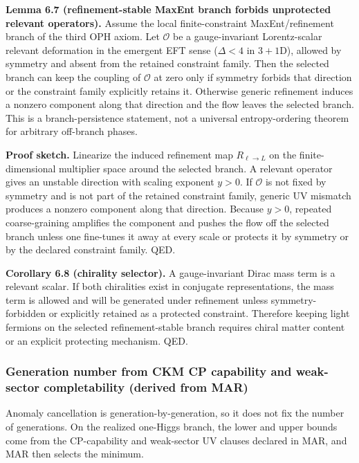 \textbf{Lemma 6.7 (refinement-stable MaxEnt branch forbids unprotected relevant operators).} Assume the local finite-constraint MaxEnt/refinement branch of the third OPH axiom. Let \(\mathcal{O}\) be a gauge-invariant Lorentz-scalar relevant deformation in the emergent EFT sense (\(\Delta<4\) in \(3+1\)D), allowed by symmetry and absent from the retained constraint family. Then the selected branch can keep the coupling of \(\mathcal{O}\) at zero only if symmetry forbids that direction or the constraint family explicitly retains it. Otherwise generic refinement induces a nonzero component along that direction and the flow leaves the selected branch. This is a branch-persistence statement, not a universal entropy-ordering theorem for arbitrary off-branch phases.

\textbf{Proof sketch.} Linearize the induced refinement map \(R_{\ell\to L}\) on the finite-dimensional multiplier space around the selected branch. A relevant operator gives an unstable direction with scaling exponent \(y>0\). If \(\mathcal{O}\) is not fixed by symmetry and is not part of the retained constraint family, generic UV mismatch produces a nonzero component along that direction. Because \(y>0\), repeated coarse-graining amplifies the component and pushes the flow off the selected branch unless one fine-tunes it away at every scale or protects it by symmetry or by the declared constraint family. QED.

\textbf{Corollary 6.8 (chirality selector).} A gauge-invariant Dirac mass term is a relevant scalar. If both chiralities exist in conjugate representations, the mass term is allowed and will be generated under refinement unless symmetry-forbidden or explicitly retained as a protected constraint. Therefore keeping light fermions on the selected refinement-stable branch requires chiral matter content or an explicit protecting mechanism. QED.

\subsubsection{Generation number from CKM CP capability and weak-sector completability (derived from MAR)}\label{64-generation-number-from-cp-violation-and-refinement-stability-derived-from-mar}

Anomaly cancellation is generation-by-generation, so it does not fix the number of generations. On the realized one-Higgs branch, the lower and upper bounds come from the CP-capability and weak-sector UV clauses declared in MAR, and MAR then selects the minimum.


